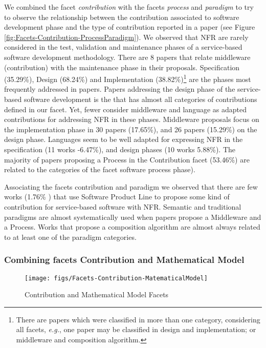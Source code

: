 We combined the facet {\em contribution} with the facets {\em process} and {\em paradigm} to try to observe the relationship between the contribution associated to software development phase and the type of contribution reported in a paper (see
Figure
\ref{fig:Facets-Contribution-ProcessParadigm}). We observed that NFR are rarely considered in the test, validation and maintenance phases of a service-based software development methodology. There are 8 papers that relate
middleware (contribution) with the maintenance phase in their  proposals. 
Specification (35.29\%), Design (68.24\%) and Implementation
(38.82\%)\footnote{There are papers which were classified in more than one
category, considering all facets, \textit{e.g.}, one paper may be classified
in design and implementation; or middleware and composition algorithm.} are the phases most frequently addressed in papers.
Papers addressing the design phase of the service-based software development is the that has almost all categories of contributions defined in our facet. Yet, fewer consider middleware and language as adapted contributions for addressing NFR in these phases.
Middleware proposals focus on the implementation phase in 30
papers (17.65\%), and 26 papers (15.29\%) on the design phase. Languages seem to be well adapted for expressing NFR in the specification  (11 works -6.47\%), and design phases (10
works 5.88\%). The majority of
papers  proposing a Process in the Contribution facet (53.46\%) are related to the
categories of the facet software process phase).  

Associating the facets contribution and paradigm we observed that there are
few works  (1.76\% ) that use Software Product Line to propose some kind of contribution for 
 service-based
software with NFR.  Semantic and traditional paradigms are almost systematically used when papers propose a
 Middleware and a Process. Works that propose a composition
algorithm are almost always related to at least one of the paradigm categories.
       
\subsubsection{Combining facets Contribution and Mathematical Model}
 \begin{figure}[ht!]
\centering
\texttt{[image: figs/Facets-Contribution-MatematicalModel]}
\caption{Contribution and Mathematical Model Facets}
\label{fig:Facets-Contribution-MatematicalModel}
\end{figure}   

